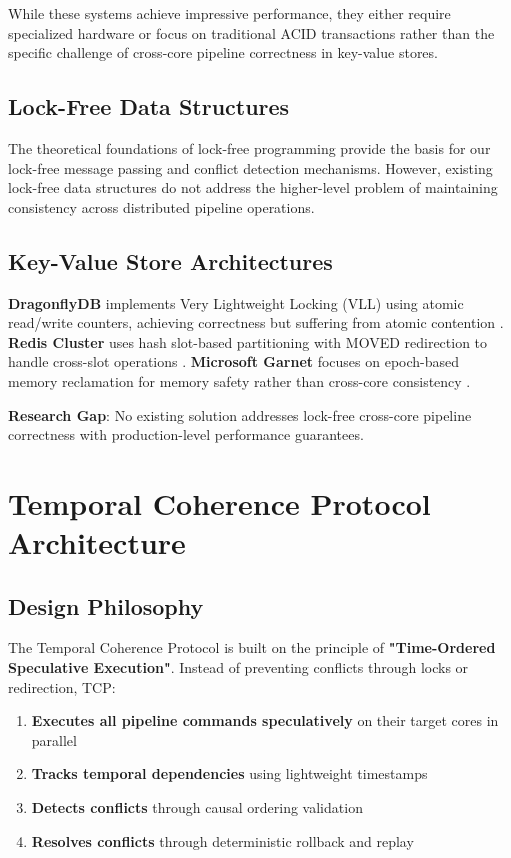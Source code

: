 \documentclass[conference]{IEEEtran}
\begin{document}
While these systems achieve impressive performance, they either require specialized hardware or focus on traditional ACID transactions rather than the specific challenge of cross-core pipeline correctness in key-value stores.

\subsection{Lock-Free Data Structures}

The theoretical foundations of lock-free programming \cite{herlihy1991wait, michael1996simple} provide the basis for our lock-free message passing and conflict detection mechanisms. However, existing lock-free data structures do not address the higher-level problem of maintaining consistency across distributed pipeline operations.

\subsection{Key-Value Store Architectures}

\textbf{DragonflyDB} implements Very Lightweight Locking (VLL) using atomic read/write counters, achieving correctness but suffering from atomic contention \cite{dragonflydb2022}. \textbf{Redis Cluster} uses hash slot-based partitioning with MOVED redirection to handle cross-slot operations \cite{redis2023cluster}. \textbf{Microsoft Garnet} focuses on epoch-based memory reclamation for memory safety rather than cross-core consistency \cite{garnet2023}.

\textbf{Research Gap}: No existing solution addresses lock-free cross-core pipeline correctness with production-level performance guarantees.

\section{Temporal Coherence Protocol Architecture}

\subsection{Design Philosophy}

The Temporal Coherence Protocol is built on the principle of \textbf{"Time-Ordered Speculative Execution"}. Instead of preventing conflicts through locks or redirection, TCP:

\begin{enumerate}
\item \textbf{Executes all pipeline commands speculatively} on their target cores in parallel
\item \textbf{Tracks temporal dependencies} using lightweight timestamps
\item \textbf{Detects conflicts} through causal ordering validation
\item \textbf{Resolves conflicts} through deterministic rollback and replay
\end{enumerate}
\end{document}
